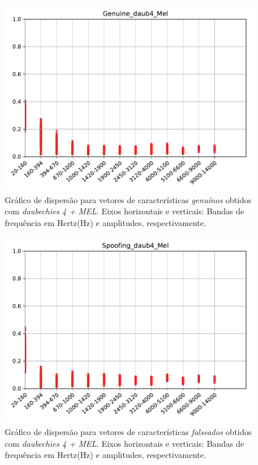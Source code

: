		\begin{figure}[H]
			\centering
			\includegraphics[scale=.8]{images/results/barkVersusMel/Genuine_daub4_Mel.pdf}
			\caption{Gráfico de dispersão para vetores de características \textit{genuínos} obtidos com \textit{daubechies 4 + MEL}.  Eixos horizontais e verticais: Bandas de frequência em Hertz(Hz) e amplitudes, respectivamente.}
			\label{fig:livedaub4mel}
		\end{figure}
		\begin{figure}[H]
			\centering
			\includegraphics[scale=.8]{images/results/barkVersusMel/Spoofing_daub4_Mel.pdf}
			\caption{Gráfico de dispersão para vetores de características \textit{falseados} obtidos com \textit{daubechies 4 + MEL}.  Eixos horizontais e verticais: Bandas de frequência em Hertz(Hz) e amplitudes, respectivamente.}
			\label{fig:spoofingdaub4mel}
		\end{figure}
